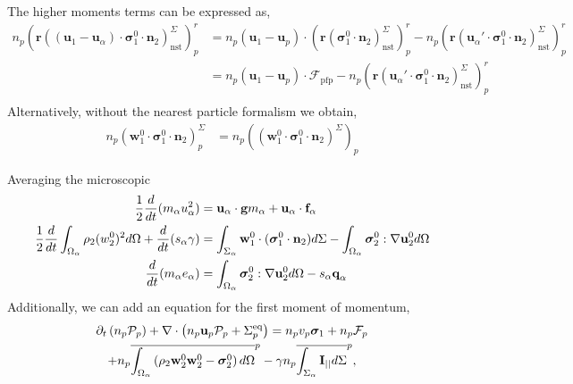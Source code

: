 The higher moments terms can be expressed as, 
\begin{align*}
    n_p (\textbf{r}((\textbf{u}_1-\textbf{u}_\alpha) \cdot \bm{\sigma}_1^0 \cdot \textbf{n}_2)^\Sigma_\text{nst})_p^r 
    &= 
    n_p (\textbf{u}_1 - \textbf{u}_p) \cdot (\textbf{r} ( \bm{\sigma}_1^0 \cdot \textbf{n}_2)^\Sigma_\text{nst} )_p^r 
    - n_p ( \textbf{r} ( \textbf{u}_\alpha' \cdot \bm{\sigma}_1^0 \cdot \textbf{n}_2)^\Sigma_\text{nst} )_p^r \\
    &= 
    n_p (\textbf{u}_1 - \textbf{u}_p)\cdot \mathcal{F}_\text{pfp} 
    - n_p (\textbf{r} ( \textbf{u}_\alpha' \cdot \bm{\sigma}_1^0 \cdot \textbf{n}_2)^\Sigma_\text{nst} )_p^r \\
\end{align*}
Alternatively, without the nearest particle formalism we obtain, 
\begin{align*}
    n_p (\textbf{w}_1^0 \cdot \bm{\sigma}_1^0 \cdot \textbf{n}_2)^\Sigma_p
    &= 
    n_p ((\textbf{w}_1^0 \cdot \bm{\sigma}_1^0 \cdot \textbf{n}_2)^\Sigma)_p 
\end{align*}

Averaging the microscopic 
\begin{align}
    \frac{1}{2}\frac{d}{d t} (m_\alpha u_\alpha^2)
    &= 
    \textbf{u}_\alpha\cdot
    \textbf{g}m_\alpha
    + 
    \textbf{u}_\alpha\cdot
    \textbf{f}_\alpha\\
    \frac{1}{2}\frac{d}{d t} \int_{\Omega_\alpha} \rho_2 (w_2^0)^2 d\Omega 
    + \frac{d}{d t} (s_\alpha \gamma) 
    &= 
    \int_{\Sigma_\alpha} \textbf{w}_1^0 \cdot (\bm{\sigma}_1^0 \cdot \textbf{n}_2) d\Sigma  
     - \int_{\Omega_\alpha} \bm{\sigma}_2^0 : \mathbf{\nabla}\textbf{u}_2^0 d\Omega  
    \\
    \frac{d}{d t} (m_\alpha e_\alpha )
    &= 
     \int_{\Omega_\alpha} \bm{\sigma}_2^0 : \mathbf{\nabla}\textbf{u}_2^0 d\Omega  
    -  s_\alpha \textbf{q}_\alpha  
\end{align}
Additionally, we can add an equation for the first moment of momentum, 
\begin{multline}
    \partial_t \left(n_p \mathcal{P}_p\right)
    + \mathbf{\nabla}\cdot \left(
        n_p \textbf{u}_p \mathcal{P}_p
    + \Sigma_p^\text{eq}
    \right)
    =
    n_p v_p \bm{\sigma}_1 
    + n_p \mathcal{F}_p\\
    +n_p\overline{\int_{\Omega_\alpha} \left(
        \rho_2 \textbf{w}_2^0  \textbf{w}_2^0 
        - \bm{\sigma}_2^0
        \right) d\Omega}^{p}
        - \gamma  n_p\overline{\int_{\Sigma_\alpha} \textbf{I}_{||} d\Sigma}^{p},
\end{multline}




